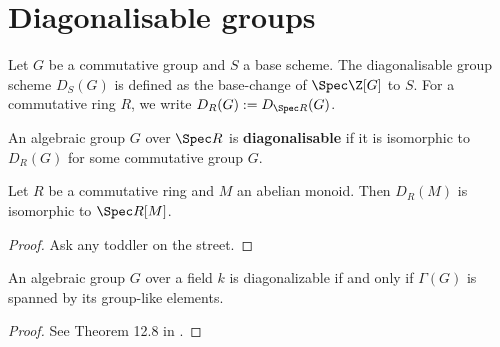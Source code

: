 \section{Diagonalisable groups}


\begin{definition}
  \label{0-diag}
  \leanok

  Let $G$ be a commutative group and $S$ a base scheme.
  The diagonalisable group scheme $D_S(G)$ is defined as the base-change of $\Spec \Z[G]$ to $S$.
  For a commutative ring $R$, we write $D_R(G) := D_{\Spec R}(G)$.
\end{definition}


\begin{definition}
  \label{0-is-diag}
  \leanok

  An algebraic group $G$ over $\Spec R$ is {\bf diagonalisable} if it is isomorphic to $D_R(G)$ for some commutative group $G$.
\end{definition}


\begin{lemma}
  \label{0-diag-spec}
  \leanok

  Let $R$ be a commutative ring and $M$ an abelian monoid.
  Then $D_R(M)$ is isomorphic to $\Spec R[M]$.
\end{lemma}
\begin{proof}
  \leanok

  Ask any toddler on the street.
\end{proof}


\begin{theorem}
  \label{0-diag-iff-grp-like-span}
  \leanok

  An algebraic group $G$ over a field $k$ is diagonalizable if and only if $\Gamma(G)$ is spanned by its group-like elements.
\end{theorem}
\begin{proof}

  See Theorem 12.8 in \cite{Milne_2017}.
\end{proof}


